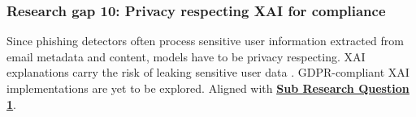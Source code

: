 
\subsubsection*{Research gap 10: Privacy respecting XAI for compliance}\label{research-gap-10}
Since phishing detectors often process sensitive user information extracted from email metadata and content, models have to be privacy respecting. XAI explanations carry the risk of leaking sensitive user data \citep{atlam2022business}. GDPR-compliant XAI implementations are yet to be explored. Aligned with \hyperref[sub-research-q1]{\uline{\textbf{Sub Research Question 1}}}.

